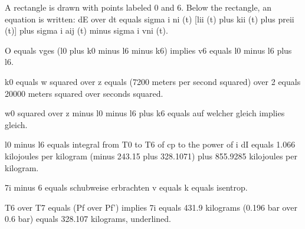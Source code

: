 A rectangle is drawn with points labeled 0 and 6. Below the rectangle, an equation is written: dE over dt equals sigma i ni (t) [lii (t) plus kii (t) plus preii (t)] plus sigma i aij (t) minus sigma i vni (t).

O equals vges (l0 plus k0 minus l6 minus k6) implies v6 equals l0 minus l6 plus l6.

k0 equals w squared over z equals (7200 meters per second squared) over 2 equals 20000 meters squared over seconds squared.

w0 squared over z minus l0 minus l6 plus k6 equals auf welcher gleich implies gleich.

l0 minus l6 equals integral from T0 to T6 of cp to the power of i dI equals 1.066 kilojoules per kilogram (minus 243.15 plus 328.1071) plus 855.9285 kilojoules per kilogram.

7i minus 6 equals schubweise erbrachten v equals k equals isentrop.

T6 over T7 equals (Pf over Pf') implies 7i equals 431.9 kilograms (0.196 bar over 0.6 bar) equals 328.107 kilograms, underlined.